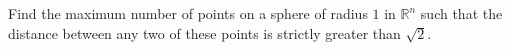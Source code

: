 Find the maximum number of points on a sphere of radius $1$ in $\mathbb{R}^n$ such that the distance between any two of these points is strictly greater than $\sqrt{2}$.
